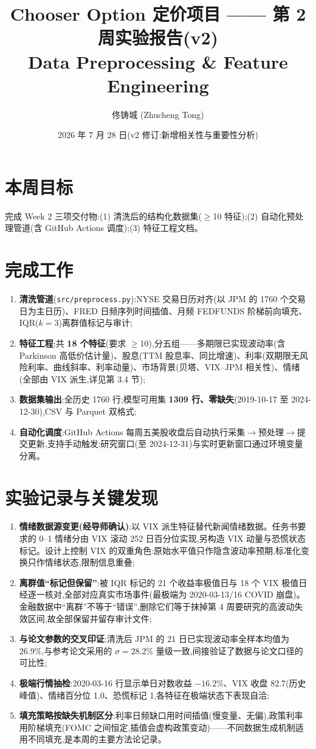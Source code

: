 \documentclass[11pt]{ctexart}
\title{\textbf{Chooser Option 定价项目 —— 第 2 周实验报告(v2)}\\
\large Data Preprocessing \& Feature Engineering}
\author{佟铸城 (Zhucheng Tong)}
\date{2026 年 7 月 28 日(v2 修订:新增相关性与重要性分析)}
\begin{document}
\maketitle

\section{本周目标}
完成 Week 2 三项交付物:(1) 清洗后的结构化数据集($\geq$10 特征);(2) 自动化预处理管道(含 GitHub Actions 调度);(3) 特征工程文档。

\section{完成工作}
\begin{enumerate}
  \item \textbf{清洗管道}(\texttt{src/preprocess.py}):NYSE 交易日历对齐(以 JPM 的 1760 个交易日为主日历)、FRED 日频序列时间插值、月频 FEDFUNDS 阶梯前向填充、IQR($k=3$)离群值标记与审计;
  \item \textbf{特征工程}:共 \textbf{18 个特征}(要求 $\geq$10),分五组——多期限已实现波动率(含 Parkinson 高低价估计量)、股息(TTM 股息率、同比增速)、利率(双期限无风险利率、曲线斜率、利率动量)、市场背景(贝塔、VIX--JPM 相关性)、情绪(全部由 VIX 派生,详见第 3.4 节);
  \item \textbf{数据集输出}:全历史 1760 行;模型可用集 \textbf{1309 行、零缺失}(2019-10-17 至 2024-12-30),CSV 与 Parquet 双格式;
  \item \textbf{自动化调度}:GitHub Actions 每周五美股收盘后自动执行采集$\to$预处理$\to$提交更新,支持手动触发;研究窗口(至 2024-12-31)与实时更新窗口通过环境变量分离。
\end{enumerate}

\section{实验记录与关键发现}
\begin{enumerate}
  \item \textbf{情绪数据源变更(经导师确认)}:以 VIX 派生特征替代新闻情绪数据。任务书要求的 0--1 情绪分由 VIX 滚动 252 日百分位实现,另构造 VIX 动量与恐慌状态标记。设计上控制 VIX 的双重角色:原始水平值只作隐含波动率预期,标准化变换只作情绪状态,限制信息重叠;
  \item \textbf{离群值``标记但保留''}:被 IQR 标记的 21 个收益率极值日与 18 个 VIX 极值日经逐一核对,全部对应真实市场事件(最极端为 2020-03-13/16 COVID 崩盘)。金融数据中``离群''不等于``错误'',删除它们等于抹掉第 4 周要研究的高波动失效区间,故全部保留并留存审计文件;
  \item \textbf{与论文参数的交叉印证}:清洗后 JPM 的 21 日已实现波动率全样本均值为 26.9\%,与参考论文采用的 $\sigma = 28.2\%$ 量级一致,间接验证了数据与论文口径的可比性;
  \item \textbf{极端行情抽检}:2020-03-16 行显示单日对数收益 $-16.2\%$、VIX 收盘 82.7(历史峰值)、情绪百分位 1.0、恐慌标记 1,各特征在极端状态下表现自洽;
  \item \textbf{填充策略按缺失机制区分}:利率日频缺口用时间插值(慢变量、无偏),政策利率用阶梯填充(FOMC 之间恒定,插值会虚构政策变动)——不同数据生成机制适用不同填充,是本周的主要方法论记录。
\end{enumerate}
\end{document}
